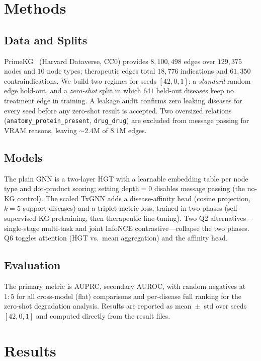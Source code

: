 \documentclass[conference]{IEEEtran}
\begin{document}
\section{Methods}
\subsection{Data and Splits}
PrimeKG~\cite{chandak2023} (Harvard Dataverse, CC0) provides $8{,}100{,}498$
edges over $129{,}375$ nodes and $10$ node types; therapeutic edges total
$18{,}776$ indications and $61{,}350$ contraindications. We build two regimes for
seeds $[42,0,1]$: a \emph{standard} random edge hold-out, and a \emph{zero-shot}
split in which $641$ held-out diseases keep no treatment edge in training. A
leakage audit confirms zero leaking diseases for every seed before any zero-shot
result is accepted. Two oversized relations
(\texttt{anatomy\_protein\_present}, \texttt{drug\_drug}) are excluded from
message passing for VRAM reasons, leaving ${\sim}2.4$M of $8.1$M edges.

\subsection{Models}
The plain GNN is a two-layer HGT with a learnable embedding table per node type
and dot-product scoring; setting depth$=0$ disables message passing (the no-KG
control). The scaled TxGNN adds a disease-affinity head (cosine projection,
$k=5$ support diseases) and a triplet metric loss, trained in two phases
(self-supervised KG pretraining, then therapeutic fine-tuning). Two Q2
alternatives---single-stage multi-task and joint InfoNCE contrastive---collapse
the two phases. Q6 toggles attention (HGT vs.\ mean aggregation) and the
affinity head.

\subsection{Evaluation}
The primary metric is AUPRC, secondary AUROC, with random negatives at $1{:}5$
for all cross-model (flat) comparisons and per-disease full ranking for the
zero-shot degradation analysis. Results are reported as mean~$\pm$~std over seeds
$[42,0,1]$ and computed directly from the result files.

\section{Results}
\end{document}
